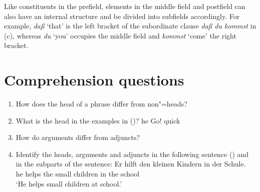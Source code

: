 {\noindent
Like constituents in the prefield, elements in the middle field and postfield can also have an internal structure and be divided into subfields accordingly.
For example, \emph{daß} `that' is the left bracket of the subordinate clause \emph{daß du kommst} in (c), whereas \emph{du} `you' occupies the middle
field and \emph{kommst} `come' the right bracket.%









\section*{Comprehension questions}


\begin{enumerate}
\item How does the head of a phrase differ from non"=heads?
\item What is the head in the examples in ()?
      \eal
      \ex he
      \ex Go!
      \ex quick
      \zl
\item How do arguments differ from adjuncts?
\item Identify the heads, arguments and adjuncts in the following sentence () and in the subparts of the sentence:
  \ea
	\gll Er hilft den kleinen Kindern in der Schule.\\
		 he helps the small children in the school\\
	\glt `He helps small children at school.' 
  \z


\end{enumerate}}
